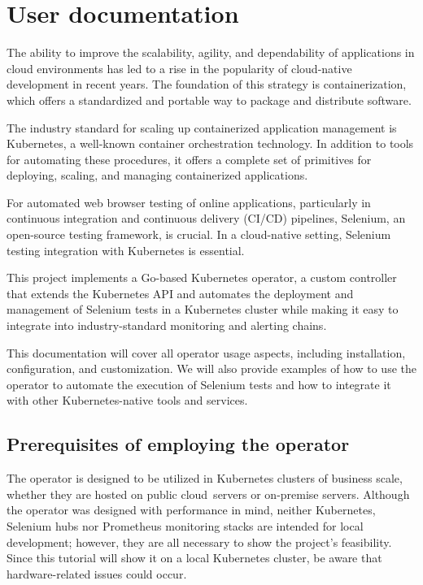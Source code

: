 \chapter{User documentation}
\label{ch:user}
The ability to improve the scalability, agility, and dependability of applications in cloud environments has led to a rise in the popularity of cloud-native development in recent years. The foundation of this strategy is containerization, which offers a standardized and portable way to package and distribute software.

The industry standard for scaling up containerized application management is Kubernetes, a well-known container orchestration technology. In addition to tools for automating these procedures, it offers a complete set of primitives for deploying, scaling, and managing containerized applications.

For automated web browser testing of online applications, particularly in continuous integration and continuous delivery (CI/CD) pipelines, Selenium, an open-source testing framework, is crucial. In a cloud-native setting, Selenium testing integration with Kubernetes is essential.

This project implements a Go-based Kubernetes operator, a custom controller that extends the Kubernetes API and automates the deployment and management of Selenium tests in a Kubernetes cluster while making it easy to integrate into industry-standard monitoring and alerting chains.

This documentation will cover all operator usage aspects, including installation, configuration, and customization. We will also provide examples of how to use the operator to automate the execution of Selenium tests and how to integrate it with other Kubernetes-native tools and services.

\section{Prerequisites of employing the operator}

The operator is designed to be utilized in Kubernetes clusters of business scale, whether they are hosted on public cloud servers or on-premise servers. Although the operator was designed with performance in mind, neither Kubernetes, Selenium hubs nor Prometheus monitoring stacks are intended for local development; however, they are all necessary to show the project's feasibility. Since this tutorial will show it on a local Kubernetes cluster, be aware that hardware-related issues could occur.

